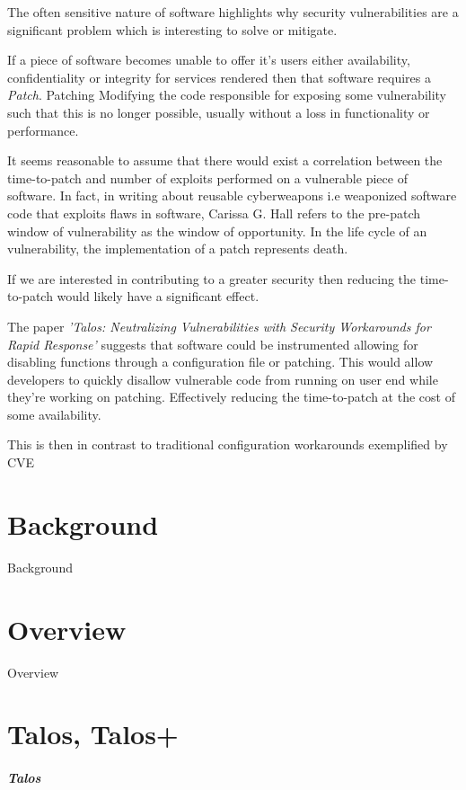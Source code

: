 \documentclass[a4paper,11pt]{report}
\begin{document}
The often sensitive nature of software highlights why security vulnerabilities are a significant problem which is interesting to solve or mitigate.

If a piece of software becomes unable to offer it's users either availability, confidentiality or integrity for services rendered then that software requires a \textit{Patch}. Patching Modifying the code responsible for exposing some vulnerability such that this is no longer possible, usually without a loss in functionality or performance.

It seems reasonable to assume that there would exist a correlation between the time-to-patch and number of exploits performed on a vulnerable piece of software. In fact, in writing about reusable cyberweapons i.e weaponized software code that exploits flaws in software, Carissa G. Hall refers to the pre-patch window of vulnerability as the window of opportunity. In the life cycle of an vulnerability, the implementation of a patch represents death.~\cite{hall2017time}

If we are interested in contributing to a greater security then reducing the time-to-patch would likely have a significant effect.

The paper \textit{'Talos: Neutralizing Vulnerabilities with Security Workarounds for Rapid Response'} suggests that software could be instrumented allowing for disabling functions through a configuration file or patching. This would allow developers to quickly disallow vulnerable code from running on user end while they're working on patching. Effectively reducing the time-to-patch at the cost of some availability.

This is then in contrast to traditional configuration workarounds exemplified by CVE





\chapter{Background}
Background
\chapter{Overview}
Overview
\chapter{Talos, Talos+}
\paragraph{Talos}
\end{document}
